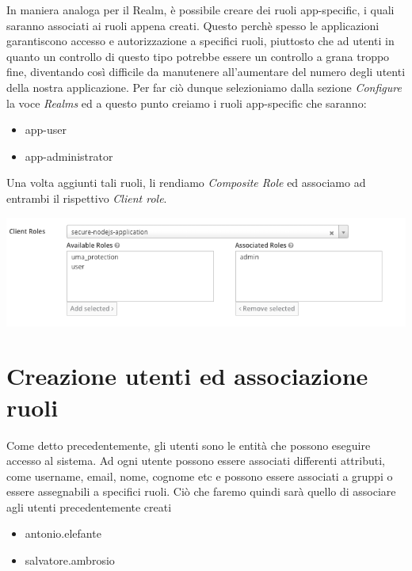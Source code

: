 \documentclass[twoside]{report}
\begin{document}
In maniera analoga per il Realm, è possibile creare dei ruoli app-specific, i quali saranno associati ai ruoli appena creati.
\bigbreak
Questo perchè spesso le applicazioni garantiscono accesso e autorizzazione a specifici ruoli, piuttosto che ad utenti in quanto un controllo di questo tipo potrebbe essere un controllo a grana troppo fine, diventando così difficile da manutenere all'aumentare del numero degli utenti della nostra applicazione.
\bigbreak
Per far ciò dunque selezioniamo dalla sezione \textit{Configure} la voce \textit{Realms} ed a questo punto creiamo i ruoli app-specific che saranno:

\begin{itemize}
	\item app-user
	\item app-administrator
\end{itemize}

Una volta aggiunti tali ruoli, li rendiamo \textit{Composite Role} ed associamo ad entrambi il rispettivo \textit{Client role}.

\begin{minipage}{\linewidth}
    \vspace{2mm}
    \centering
    \includegraphics[width= \linewidth]{15.png}
    \vspace{2mm}
\end{minipage} 

\section{Creazione utenti ed associazione ruoli}

Come detto precedentemente, gli utenti sono le entità che possono eseguire accesso al sistema. Ad ogni utente possono essere associati differenti attributi, come username, email, nome, cognome etc e possono essere associati a gruppi o essere assegnabili a specifici ruoli.
\bigbreak
Ciò che faremo quindi sarà quello di associare agli utenti precedentemente creati

\begin{itemize}
	\item antonio.elefante
	\item salvatore.ambrosio
\end{itemize}
\end{document}
